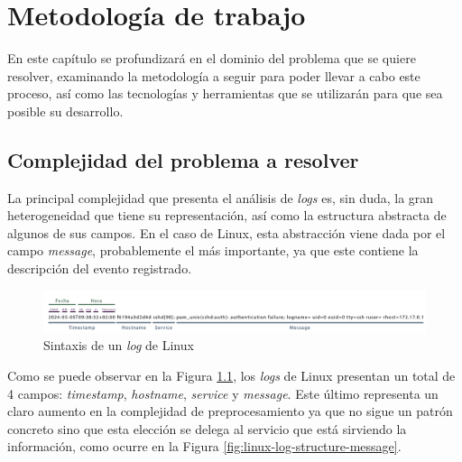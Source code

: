 \chapter{Metodología de trabajo}

En este capítulo se profundizará en el dominio del problema que se quiere resolver, examinando la metodología a seguir para poder llevar a cabo este proceso, así como las tecnologías y herramientas que se utilizarán para que sea posible su desarrollo.


\section{Complejidad del problema a resolver}

La principal complejidad que presenta el análisis de \textit{logs} es, sin duda, la gran heterogeneidad que tiene su representación, así como la estructura abstracta de algunos de sus campos. En el caso de Linux, esta abstracción viene dada por el campo \textit{message}, probablemente el más importante, ya que este contiene la descripción del evento registrado.

\vspace{-1mm}

\begin{figure}[H]
    \centering
    \includegraphics[width=1\linewidth]{imagenes/linux-log-structure.png}
    \caption{Sintaxis de un \textit{log} de Linux}
    \label{fig:linux-log-structure}
\end{figure}

\vspace{-0.5mm}

Como se puede observar en la Figura \ref{fig:linux-log-structure}, los \textit{logs} de Linux presentan un total de 4 campos: \textit{timestamp}, \textit{hostname}, \textit{service} y \textit{message}. Este último representa un claro aumento en la complejidad de preprocesamiento ya que no sigue un patrón concreto sino que esta elección se delega al servicio que está sirviendo la información, como ocurre en la Figura \ref{fig:linux-log-structure-message}.

\vspace{-0.5mm}

